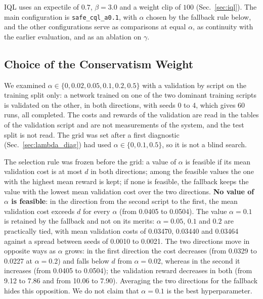 IQL uses an expectile of $0.7$, $\beta=3.0$ and a weight clip of $100$ (Sec.~\ref{sec:iql}).%
The main configuration is \texttt{safe\_cql\_a0.1}, with $\alpha$ chosen by the fallback rule below, and the other configurations serve as comparisons at equal $\alpha$, as continuity with the earlier evaluation, and as an ablation on $\gamma$.%

\subsection{Choice of the Conservatism Weight}
\label{sec:alpha}

We examined $\alpha\in\{0,0.02,0.05,0.1,0.2,0.5\}$ with a validation by script on the training split only: a network trained on one of the two dominant training scripts is validated on the other, in both directions, with seeds 0 to 4, which gives 60 runs, all completed.%
The costs and rewards of the validation are read in the tables of the validation script and are not measurements of the system, and the test split is not read.%
The grid was set after a first diagnostic (Sec.~\ref{sec:lambda_diag}) had used $\alpha\in\{0,0.1,0.5\}$, so it is not a blind search.%

The selection rule was frozen before the grid: a value of $\alpha$ is feasible if its mean validation cost is at most $d$ in both directions; among the feasible values the one with the highest mean reward is kept; if none is feasible, the fallback keeps the value with the lowest mean validation cost over the two directions.%
\textbf{No value of $\alpha$ is feasible}: in the direction from the second script to the first, the mean validation cost exceeds $d$ for every $\alpha$ (from 0.0405 to 0.0504).%
The value $\alpha=0.1$ is retained by the fallback and not on its merits: $\alpha=0.05$, $0.1$ and $0.2$ are practically tied, with mean validation costs of 0.03470, 0.03440 and 0.03464 against a spread between seeds of 0.0010 to 0.0021.%
The two directions move in opposite ways as $\alpha$ grows: in the first direction the cost decreases (from 0.0329 to 0.0227 at $\alpha=0.2$) and falls below $d$ from $\alpha=0.02$, whereas in the second it increases (from 0.0405 to 0.0504); the validation reward decreases in both (from 9.12 to 7.86 and from 10.06 to 7.90).%
Averaging the two directions for the fallback hides this opposition.%
We do not claim that $\alpha=0.1$ is the best hyperparameter.%

